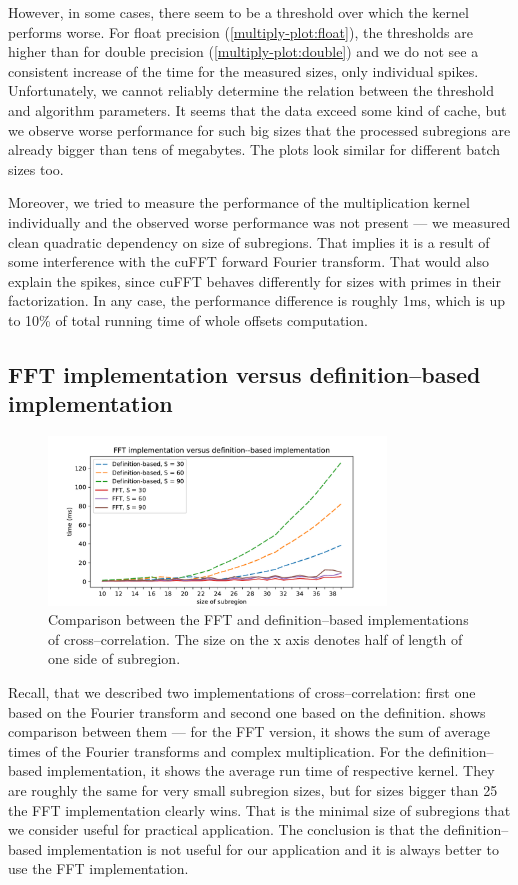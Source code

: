 However, in some cases, there seem to be a threshold over which the kernel performs worse. For float precision (\cref {multiply-plot:float}), the thresholds are higher than for double precision (\cref {multiply-plot:double}) and we do not see a consistent increase of the time for the measured sizes, only individual spikes. Unfortunately, we cannot reliably determine the relation between the threshold and algorithm parameters. It seems that the data exceed some kind of cache, but we observe worse performance for such big sizes that the processed subregions are already bigger than tens of megabytes. The plots look similar for different batch sizes too.

Moreover, we tried to measure the performance of the multiplication kernel individually and the observed worse performance was not present --- we measured clean quadratic dependency on size of subregions. That implies it is a result of some interference with the cuFFT forward Fourier transform. That would also explain the spikes, since cuFFT behaves differently for sizes with primes in their factorization. In any case, the performance difference is roughly 1ms, which is up to 10\% of total running time of whole offsets computation.

\subsection{FFT implementation versus definition--based implementation}

\begin{figure}
	\centering
	\includegraphics[width=0.8\textwidth]{img/eval/cross-compare}
	\caption{Comparison between the FFT and definition--based implementations of cross--correlation. The size on the x axis denotes half of length of one side of subregion.}
	\label{cross-compare}
\end{figure}

Recall, that we described two implementations of cross--correlation: first one based on the Fourier transform and second one based on the definition.  shows comparison between them --- for the FFT version, it shows the sum of average times of the Fourier transforms and complex multiplication. For the definition--based implementation, it shows the average run time of respective kernel. They are roughly the same for very small subregion sizes, but for sizes bigger than 25 the FFT implementation clearly wins. That is the minimal size of subregions that we consider useful for practical application. The conclusion is that the definition--based implementation is not useful for our application and it is always better to use the FFT implementation.


